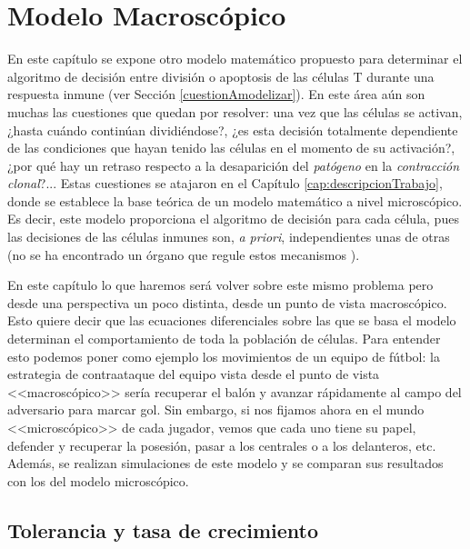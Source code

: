 
\chapter{Modelo Macroscópico}
\label{cap:modeloMacroscopico}

En este capítulo se expone otro modelo matemático propuesto para determinar el algoritmo de decisión entre división o apoptosis de las células T durante una respuesta inmune (ver Sección \ref{cuestionAmodelizar}). En este área aún son muchas las cuestiones que quedan por resolver: una vez que las células se activan, ¿hasta cuándo continúan dividiéndose?, ¿es esta decisión totalmente dependiente de las condiciones que hayan tenido las células en el momento de su activación?, ¿por qué hay un retraso respecto a la desaparición del \textit{patógeno} en la \textit{contracción clonal}?... Estas cuestiones se atajaron en el Capítulo \ref{cap:descripcionTrabajo}, donde se establece la base teórica de un modelo matemático a nivel microscópico. Es decir, este modelo proporciona el algoritmo de decisión para cada célula, pues las decisiones de las células inmunes son, \textit{a priori}, independientes unas de otras (no se ha encontrado un órgano que regule estos mecanismos \citep{arias2016emergent}).

En este capítulo lo que haremos será volver sobre este mismo problema pero desde una perspectiva un poco distinta, desde un punto de vista macroscópico. Esto quiere decir que las ecuaciones diferenciales sobre las que se basa el modelo determinan el comportamiento de toda la población de células. Para entender esto podemos poner como ejemplo los movimientos de un equipo de fútbol: la estrategia de contraataque del equipo vista desde el punto de vista <<macroscópico>> sería recuperar el balón y avanzar rápidamente al campo del adversario para marcar gol. Sin embargo, si nos fijamos ahora en el mundo <<microscópico>> de cada jugador, vemos que cada uno tiene su papel, defender y recuperar la posesión, pasar a los centrales o a los delanteros, etc. Además, se realizan simulaciones de este modelo y se comparan sus resultados con los del modelo microscópico.



\section{Tolerancia y tasa de crecimiento}

